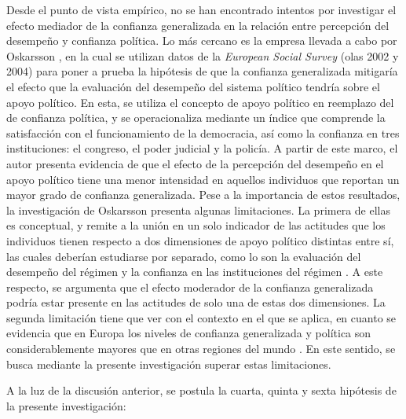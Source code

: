 \documentclass[12pt,twoside]{templates/facsothesis}
\begin{document}
Desde el punto de vista empírico, no se han encontrado intentos por investigar el efecto mediador de la confianza generalizada en la relación entre percepción del desempeño y confianza política. Lo más cercano es la empresa llevada a cabo por Oskarsson \citeyearpar{oskarssonGeneralizedTrustPolitical2010}, en la cual se utilizan datos de la \emph{European Social Survey} (olas 2002 y 2004) para poner a prueba la hipótesis de que la confianza generalizada mitigaría el efecto que la evaluación del desempeño del sistema político tendría sobre el apoyo político. En esta, se utiliza el concepto de apoyo político en reemplazo del de confianza política, y se operacionaliza mediante un índice que comprende la satisfacción con el funcionamiento de la democracia, así como la confianza en tres instituciones: el congreso, el poder judicial y la policía. A partir de este marco, el autor presenta evidencia de que el efecto de la percepción del desempeño en el apoyo político tiene una menor intensidad en aquellos individuos que reportan un mayor grado de confianza generalizada. Pese a la importancia de estos resultados, la investigación de Oskarsson presenta algunas limitaciones. La primera de ellas es conceptual, y remite a la unión en un solo indicador de las actitudes que los individuos tienen respecto a dos dimensiones de apoyo político distintas entre sí, las cuales deberían estudiarse por separado, como lo son la evaluación del desempeño del régimen y la confianza en las instituciones del régimen \citep{norrisDemocraticDeficitCritical2011}. A este respecto, se argumenta que el efecto moderador de la confianza generalizada podría estar presente en las actitudes de solo una de estas dos dimensiones. La segunda limitación tiene que ver con el contexto en el que se aplica, en cuanto se evidencia que en Europa los niveles de confianza generalizada y política son considerablemente mayores que en otras regiones del mundo \citep{mattesSocialPoliticalTrust2018}. En este sentido, se busca mediante la presente investigación superar estas limitaciones.

A la luz de la discusión anterior, se postula la cuarta, quinta y sexta hipótesis de la presente investigación:
\end{document}
